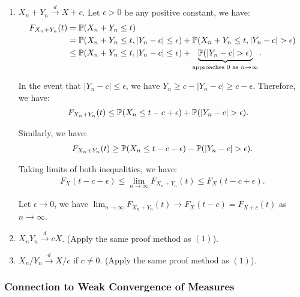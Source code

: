 \begin{proof*}
\ \begin{enumerate}     
    \item $X_n + Y_n \xrightarrow{d} X + c$.
    Let $\epsilon>0$ be any positive constant, we have:
    \begin{align*}
        F_{X_n+Y_n}(t) &= \mathbb{P}(X_n + Y_n \le t) \\ 
            &= \mathbb{P}(X_n + Y_n \le t, |Y_n - c| \le \epsilon) + \mathbb{P}(X_n + Y_n \le t, |Y_n - c| > \epsilon) \\
            &\le \mathbb{P}(X_n + Y_n \le t, |Y_n - c| \le \epsilon) + \underbrace{\mathbb{P}(|Y_n - c| > \epsilon)}_{\text{approaches } 0 \text{ as } n\to\infty}.
    \end{align*} 

    \noindent In the event that $|Y_n - c| \le \epsilon$, we have $Y_n \ge c - |Y_n - c| \ge c - \epsilon$. Therefore, we have:
    \begin{align*}
        F_{X_n + Y_n}(t) &\le \Pm(X_n \le t - c + \epsilon) + \Pm(|Y_n - c|>\epsilon).
    \end{align*} 

    \noindent Similarly, we have:
    \begin{align*}
         F_{X_n + Y_n}(t) \ge \mathbb{P}(X_n \le t - c - \epsilon) - \mathbb{P}(|Y_n - c| > \epsilon).
    \end{align*} 

    \noindent Taking limits of both inequalities, we have:
    \begin{align*}
        F_{X}(t - c - \epsilon) \le \lim_{n\to\infty} F_{X_n + Y_n}(t) \le F_X(t - c + \epsilon). 
    \end{align*} 

    \noindent Let $\epsilon\to0$, we have $\lim_{n\to\infty}F_{X_n+Y_n}(t) \to F_X(t - c) = F_{X+c}(t)$ as $n\to\infty$.
    \item $X_nY_n \xrightarrow{d} cX$. (Apply the same proof method as $(1)$).
    \item $X_n/Y_n \xrightarrow{d} X/c$ if $c \ne 0$. (Apply the same proof method as $(1)$). 
\end{enumerate} 
\end{proof*} 

\subsubsection*{Connection to Weak Convergence of Measures}

